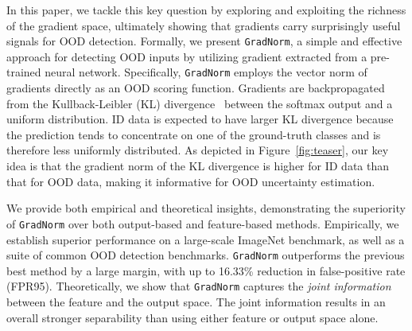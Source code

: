 \documentclass{article}
\makeatletter
\newcommand{\SL}[1]{{\color{blue}[\textbf{Sharon}: #1]}}
\DeclareRobustCommand\onedot{\futurelet\@let@token\@onedot}
\def\@onedot{\ifx\@let@token.\else.\null\fi\xspace}
\def\eg{\emph{e.g}\onedot} \def\Eg{\emph{E.g}\onedot}
\makeatother
\begin{document}
In this paper, we tackle this key question by exploring and exploiting the richness of the {gradient space}, ultimately showing that {gradients} carry surprisingly useful signals for OOD detection. Formally, we present \texttt{GradNorm}, a simple and effective approach for detecting OOD inputs by utilizing gradient extracted from a pre-trained neural network. Specifically, \texttt{GradNorm} employs the vector norm of gradients directly as an OOD scoring function. Gradients are backpropagated from the Kullback-Leibler (KL) divergence~\cite{kullback1951information} between the softmax output and a uniform distribution. ID data is expected to have larger KL divergence because the prediction tends to concentrate on one of the ground-truth classes and  is therefore  less uniformly distributed. 
As depicted in Figure~\ref{fig:teaser}, our key idea is that the gradient norm of the KL divergence is higher for ID data than that for OOD data, making it informative for OOD uncertainty estimation. %

We provide both empirical and theoretical insights, demonstrating the superiority of \texttt{GradNorm} over both output-based and feature-based methods. Empirically, we establish superior performance on a large-scale ImageNet benchmark, as well as a suite of common OOD detection benchmarks. 
\texttt{GradNorm} outperforms the previous best method by a large margin, with up to {16.33}\% reduction in false-positive rate (FPR95). Theoretically, we show that \texttt{GradNorm} captures the \emph{joint information} between the feature and the output space. The joint information results in an overall stronger separability than using either feature or output space alone. 

 
\end{document}
